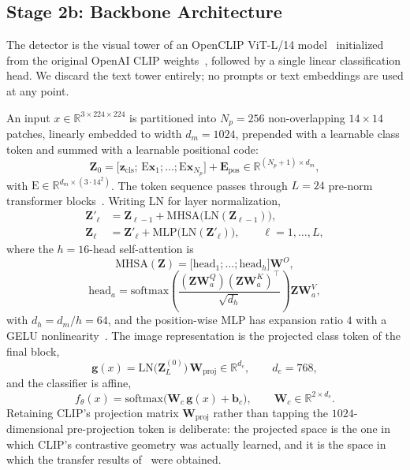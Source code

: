 \documentclass[10pt,journal]{IEEEtran}
\newcommand{\vect}[1]{\boldsymbol{#1}}
\newcommand{\mat}[1]{\mathbf{#1}}
\newcommand{\real}{\mathbb{R}}
\begin{document}
\subsection{Stage 2b: Backbone Architecture}\label{sec:arch}
The detector is the visual tower of an OpenCLIP ViT-L/14
model~\cite{ilharco2021openclip,cherti2023openclip} initialized from the
original OpenAI CLIP weights~\cite{radford2021clip}, followed by a single
linear classification head. We discard the text tower entirely; no prompts or
text embeddings are used at any point.

An input $x\in\real^{3\times224\times224}$ is partitioned into $N_p=256$
non-overlapping $14\times14$ patches, linearly embedded to width $d_m=1024$,
prepended with a learnable class token and summed with a learnable positional
code:
\begin{equation}
\mat{Z}_0=\big[\vect{z}_{\mathrm{cls}};\,
      \mathrm{E}\vect{x}_1;\dots;\mathrm{E}\vect{x}_{N_p}\big]
      +\mat{E}_{\mathrm{pos}}
  \in\real^{(N_p+1)\times d_m},
\end{equation}
with $\mathrm{E}\in\real^{d_m\times(3\cdot14^2)}$. The token sequence passes
through $L=24$ pre-norm transformer blocks~\cite{vaswani2017attention,
dosovitskiy2021vit,ba2016layernorm}. Writing $\mathrm{LN}$ for layer
normalization,
\begin{align}
\mat{Z}'_{\ell}&=\mat{Z}_{\ell-1}
   +\mathrm{MHSA}\big(\mathrm{LN}(\mat{Z}_{\ell-1})\big), \label{eq:blk1}\\
\mat{Z}_{\ell}&=\mat{Z}'_{\ell}
   +\mathrm{MLP}\big(\mathrm{LN}(\mat{Z}'_{\ell})\big),
   \qquad \ell=1,\dots,L, \label{eq:blk2}
\end{align}
where the $h=16$-head self-attention is
\begin{equation}
\mathrm{MHSA}(\mat{Z})=\big[\mathrm{head}_1;\dots;\mathrm{head}_h\big]\mat{W}^{O},
\end{equation}
\begin{equation}
\mathrm{head}_a=\mathrm{softmax}\!\left(
  \frac{(\mat{Z}\mat{W}^{Q}_a)(\mat{Z}\mat{W}^{K}_a)^{\!\top}}{\sqrt{d_h}}
  \right)\mat{Z}\mat{W}^{V}_a,
\label{eq:attn}
\end{equation}
with $d_h=d_m/h=64$, and the position-wise MLP has expansion ratio $4$ with a
GELU nonlinearity~\cite{hendrycks2016gelu}. The image representation is the
projected class token of the final block,
\begin{equation}
\vect{g}(x)=\mathrm{LN}\big(\mat{Z}_L^{(0)}\big)\,\mat{W}_{\mathrm{proj}}
  \in\real^{d_e},\qquad d_e=768,
\end{equation}
and the classifier is affine,
\begin{equation}
f_\theta(x)=\mathrm{softmax}\big(\mat{W}_c\,\vect{g}(x)+\vect{b}_c\big),
\qquad \mat{W}_c\in\real^{2\times d_e}.
\label{eq:head}
\end{equation}
Retaining CLIP's projection matrix $\mat{W}_{\mathrm{proj}}$ rather than
tapping the $1024$-dimensional pre-projection token is deliberate: the
projected space is the one in which CLIP's contrastive geometry was actually
learned, and it is the space in which the transfer results
of~\cite{ojha2023universal} were obtained.
\end{document}
